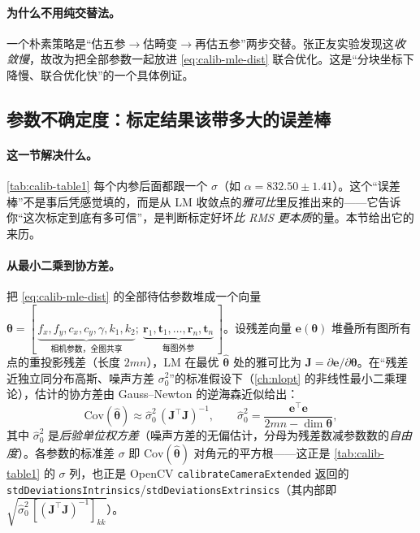 \paragraph{为什么不用纯交替法。}
一个朴素策略是“估五参$\to$估畸变$\to$再估五参”两步交替。张正友实验发现这\emph{收敛慢}\cite{zhang2000calibration}，故改为把全部参数一起放进 \cref{eq:calib-mle-dist} 联合优化。这是“分块坐标下降慢、联合优化快”的一个具体例证。

\subsection{参数不确定度：标定结果该带多大的误差棒}
\label{sec:calib-uncertainty}

\paragraph{这一节解决什么。}
\cref{tab:calib-table1} 每个内参后面都跟一个 $\sigma$（如 $\alpha=832.50\pm1.41$）。这个“误差棒”不是事后凭感觉填的，而是从 LM 收敛点的\emph{雅可比}里反推出来的——它告诉你“这次标定到底有多可信”，是判断标定好坏\emph{比 RMS 更本质}的量。本节给出它的来历。

\paragraph{从最小二乘到协方差。}
把 \cref{eq:calib-mle-dist} 的全部待估参数堆成一个向量 $\boldsymbol{\theta}=[\,\underbrace{f_x,f_y,c_x,c_y,\gamma,k_1,k_2}_{\text{相机参数，全图共享}};\ \underbrace{\mathbf{r}_1,\mathbf{t}_1,\ldots,\mathbf{r}_n,\mathbf{t}_n}_{\text{每图外参}}\,]$。设残差向量 $\mathbf{e}(\boldsymbol{\theta})$ 堆叠所有图所有点的重投影残差（长度 $2mn$），LM 在最优 $\hat{\boldsymbol{\theta}}$ 处的雅可比为 $\mathbf{J}=\partial\mathbf{e}/\partial\boldsymbol{\theta}$。在“残差近独立同分布高斯、噪声方差 $\sigma_0^2$”的标准假设下（\cref{ch:nlopt} 的非线性最小二乘理论），估计的协方差由 Gauss--Newton 的逆海森近似给出：
\begin{equation}
  \mathrm{Cov}(\hat{\boldsymbol{\theta}}) \approx \hat\sigma_0^2\,(\mathbf{J}^\top\mathbf{J})^{-1},
  \qquad
  \hat\sigma_0^2 = \frac{\mathbf{e}^\top\mathbf{e}}{2mn - \dim\boldsymbol{\theta}},
  \label{eq:calib-covariance}
\end{equation}
其中 $\hat\sigma_0^2$ 是\emph{后验单位权方差}（噪声方差的无偏估计，分母为残差数减参数数的\emph{自由度}）。各参数的标准差 $\sigma$ 即 $\mathrm{Cov}(\hat{\boldsymbol{\theta}})$ 对角元的平方根——这正是 \cref{tab:calib-table1} 的 $\sigma$ 列\cite{zhang2000calibration}，也正是 OpenCV \texttt{calibrateCameraExtended} 返回的 \texttt{stdDeviationsIntrinsics}/\texttt{stdDeviationsExtrinsics}（其内部即 $\sqrt{\hat\sigma_0^2\,[(\mathbf{J}^\top\mathbf{J})^{-1}]_{kk}}$\cite{opencv2024calib}）。


